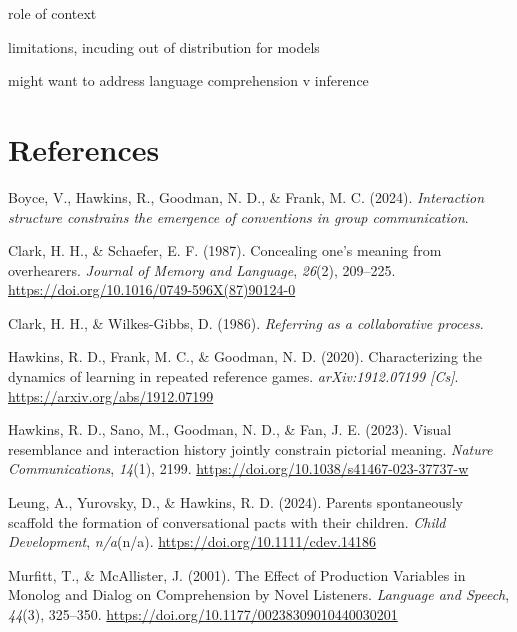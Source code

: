 \documentclass[10pt, letterpaper]{article}
\begin{document}
role of context

limitations, incuding out of distribution for models

might want to address language comprehension v inference

\section{References}\label{references}

\setlength{\parindent}{-0.1in} 
\setlength{\leftskip}{0.125in}

\noindent

\label{refs}
\begin{CSLReferences}{1}{0}
Boyce, V., Hawkins, R., Goodman, N. D., \& Frank, M. C. (2024).
\emph{Interaction structure constrains the emergence of conventions in
group communication}.

Clark, H. H., \& Schaefer, E. F. (1987). Concealing one's meaning from
overhearers. \emph{Journal of Memory and Language}, \emph{26}(2),
209--225. \url{https://doi.org/10.1016/0749-596X(87)90124-0}

Clark, H. H., \& Wilkes-Gibbs, D. (1986). \emph{Referring as a
collaborative process}.

Hawkins, R. D., Frank, M. C., \& Goodman, N. D. (2020). Characterizing
the dynamics of learning in repeated reference games.
\emph{arXiv:1912.07199 {[}Cs{]}}. \url{https://arxiv.org/abs/1912.07199}

Hawkins, R. D., Sano, M., Goodman, N. D., \& Fan, J. E. (2023). Visual
resemblance and interaction history jointly constrain pictorial meaning.
\emph{Nature Communications}, \emph{14}(1), 2199.
\url{https://doi.org/10.1038/s41467-023-37737-w}

Leung, A., Yurovsky, D., \& Hawkins, R. D. (2024). Parents spontaneously
scaffold the formation of conversational pacts with their children.
\emph{Child Development}, \emph{n/a}(n/a).
\url{https://doi.org/10.1111/cdev.14186}

Murfitt, T., \& McAllister, J. (2001). The {Effect} of {Production
Variables} in {Monolog} and {Dialog} on {Comprehension} by {Novel
Listeners}. \emph{Language and Speech}, \emph{44}(3), 325--350.
\url{https://doi.org/10.1177/00238309010440030201}


\end{CSLReferences}
\end{document}

